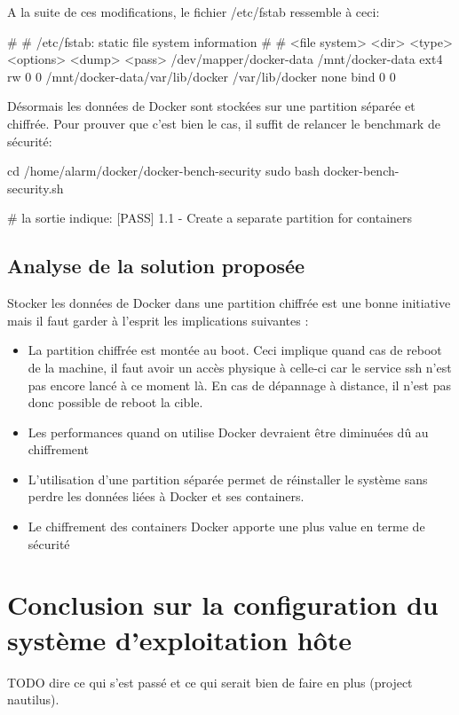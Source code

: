 \documentclass[11pt,a4paper,oneside]{report}
\begin{document}
A la suite de ces modifications, le fichier /etc/fstab ressemble à ceci:
\begin{bashcode}
#
# /etc/fstab: static file system information
#
# <file system> <dir>   <type>  <options>       <dump>  <pass>
/dev/mapper/docker-data /mnt/docker-data ext4 rw 0 0
/mnt/docker-data/var/lib/docker /var/lib/docker none bind 0 0
\end{bashcode}


Désormais les données de Docker sont stockées sur une partition séparée et chiffrée. Pour prouver que c'est bien le cas, il suffit de relancer le benchmark de sécurité:

\begin{bashcode}
cd /home/alarm/docker/docker-bench-security
sudo bash docker-bench-security.sh

# la sortie indique:
[PASS] 1.1  - Create a separate partition for containers
\end{bashcode}


\subsection{Analyse de la solution proposée}
Stocker les données de Docker dans une partition chiffrée est une bonne initiative mais il faut garder à l'esprit les implications suivantes :
\begin{itemize}

\item La partition chiffrée est montée au boot. Ceci implique quand cas de reboot de la machine, il faut avoir un accès physique à celle-ci car le service ssh n'est pas encore lancé à ce moment là. En cas de dépannage à distance, il n'est pas donc possible de reboot la cible.
\item Les performances quand on utilise Docker devraient être diminuées dû au chiffrement
\item L'utilisation d'une partition séparée permet de réinstaller le système sans perdre les données liées à Docker et ses containers.
\item Le chiffrement des containers Docker apporte une plus value en terme de sécurité
\end{itemize}

\section{Conclusion sur la configuration du système d'exploitation hôte}
TODO dire ce qui s'est passé et ce qui serait bien de faire en plus (project nautilus).
\end{document}
